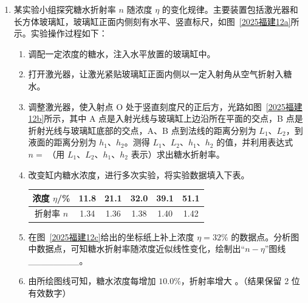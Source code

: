 \documentclass[\gkver]{gaokaozhenti}
\begin{document}
\begin{enumerate}
{联立解得 $Q_{1}:Q_{2} = \sqrt{3}:1$


如图所示，根据平衡条件可知检验电荷受到的重力和两点电荷对其的库仑力组成一个封闭的三角形，若在 $PQ_{1}$ 连线上存在其它点能让同一检验电荷维持平衡状态，此时点电荷 $Q_{1}$ 对检验电荷的库仑力 $F_{PQ1}$ 变大，根据三角形法则可知此时点电荷 $Q_{2}$ 对检验电荷的库仑力必然增大；由于此时检验电荷与点电荷 $Q_{2}$ 间的距离在增大，库仑力在减小，故矛盾，假设不成立，故在 $PQ_{1}$ 连线上不存在其它点能让同一检验电荷维持平衡状态。
}

\item
某实验小组探究糖水折射率 $n$ 随浓度 $\eta$ 的变化规律。主要装置包括激光器和长方体玻璃缸，玻璃缸正面内侧刻有水平、竖直标尺，如图~\ref{2025福建12a}所示。实验操作过程如下：
\begin{enumerate}
	\item
	调配一定浓度的糖水，注入水平放置的玻璃缸中。
	\item
	打开激光器，让激光紧贴玻璃缸正面内侧以一定入射角从空气折射入糖水。
	\item
	调整激光器，使入射点 O 处于竖直刻度尺的正后方，光路如图~\ref{2025福建12b}所示，其中 A 点是入射光线与玻璃缸上边沿所在平面的交点，B 点是折射光线与玻璃缸底部的交点，A、B 点到法线的距离分别为 $L_{1}$、$L_{2}$，到液面的距离分别为 $h_{1}$、$h_{2}$。测得 $L_{1}$、$L_{2}$、$h_{1}$、$h_{2}$ 的值，并利用表达式 $n =$ （用 $L_{1}$、$L_{2}$、$h_{1}$、$h_{2}$ 表示）求出糖水折射率。
	\item
	改变缸内糖水浓度，进行多次实验，将实验数据填入下表。

\begin{center}
\begin{tabular}{|c|c|c|c|c|c|}
\hline
浓度 $\eta$/\% & 11.8 & 21.1 & 32.0 & 39.1 & 51.1 \\
\hline
折射率 $n$ & 1.34 & 1.36 & 1.38 & 1.40 & 1.42 \\
\hline
\end{tabular}
\end{center}
	\item
	在图~\ref{2025福建12c}给出的坐标纸上补上浓度 $\eta = 32\%$ 的数据点。分析图中数据点，可知糖水折射率随浓度近似线性变化，绘制出“$n-\eta$”图线\_\_\_\_\_\_\_\_。
	\item
	由所绘图线可知，糖水浓度每增加 $10.0\%$，折射率增大 。（结果保留 2 位有效数字）
\end{enumerate}


\end{enumerate}
\end{document}
